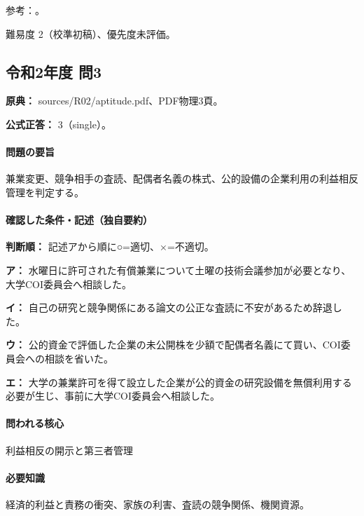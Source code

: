 \par 参考：\cite{scj_code2013}。

\par 難易度 2（校準初稿）、優先度未評価。

\subsection{令和2年度 問3}
\label{q:r02-reg-apt-03}

\noindent\textbf{原典：} sources/R02/aptitude.pdf、PDF物理3頁。

\textbf{公式正答：} 3（single）。

\paragraph{問題の要旨} 兼業変更、競争相手の査読、配偶者名義の株式、公的設備の企業利用の利益相反管理を判定する。

\paragraph{確認した条件・記述（独自要約）}\mbox{}\par

\noindent\textbf{判断順：} 記述アから順に○=適切、×=不適切。\par

\noindent\textbf{ア：} 水曜日に許可された有償兼業について土曜の技術会議参加が必要となり、大学COI委員会へ相談した。\par

\noindent\textbf{イ：} 自己の研究と競争関係にある論文の公正な査読に不安があるため辞退した。\par

\noindent\textbf{ウ：} 公的資金で評価した企業の未公開株を少額で配偶者名義にて買い、COI委員会への相談を省いた。\par

\noindent\textbf{エ：} 大学の兼業許可を得て設立した企業が公的資金の研究設備を無償利用する必要が生じ、事前に大学COI委員会へ相談した。\par

\paragraph{問われる核心} 利益相反の開示と第三者管理

\paragraph{必要知識} 経済的利益と責務の衝突、家族の利害、査読の競争関係、機関資源。

